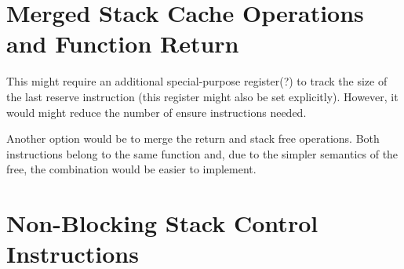 \documentclass[a4paper,fontsize=10pt,twoside,DIV15,BCOR12mm,headinclude=true,footinclude=false,pagesize,bibtotoc]{scrbook}
\newcommand{\comment}[3]{

\textsf{\textbf{#1}} {\color{#3}#2}}
\newcommand{\martin}[1]{\comment{Martin}{#1}{Blue}}
\newcommand{\stefan}[1]{\comment{Stefan}{#1}{RoyalPurple}}
\renewcommand{\martin}[1]{}
\renewcommand{\stefan}[1]{}
\begin{document}
\stefan{For now the bypass is defined as load always from memory, even if it is in the cache, but there is no real disadvantage to checking the
cache first (except that bypass cannot be used to achieve a perfectly stable timing). But should a bypass update the LRU if it is a cache
hit? (probably not, it should not modify the cache state).

On the other hand, for synchronization we need a bypass that \emph{always} checks main memory. For consistency reasons, we may want to
update the data cache if it contains the accessed address.}

\section{Merged Stack Cache Operations and Function Return}

This might require an additional special-purpose register(?) to track the size
of the last reserve instruction (this register might also be set explicitly).
However, it would might reduce the number of ensure instructions needed.

Another option would be to merge the return and stack free operations. Both
instructions belong to the same function and, due to the simpler semantics of
the free, the combination would be easier to implement.

\stefan{I doubt that merging those functions would actually gain something. It reduces the flexibility for the compiler to perform ensure
only where needed, may limit the possibilities for passing data over the stack cache, and requires additional
code to restore the special registers that are required to track the size of the stack. Only gain I see is when the word in front of the
method code that stores the size of the method is used to store the stack size as 16bit value, and limit the size of the method to a 16bit
value. Then no additional data needs to be transferred. The stack control instructions would still be required to allow the compiler to
allocate stack e.g. only in certain contexts.}

\martin{If stack operations only happens at function call
and return this merge would make sense. It makes also
very clear that M$ memory access and S$ memory access are coordinated.}

\section{Non-Blocking Stack Control Instructions}
\end{document}
